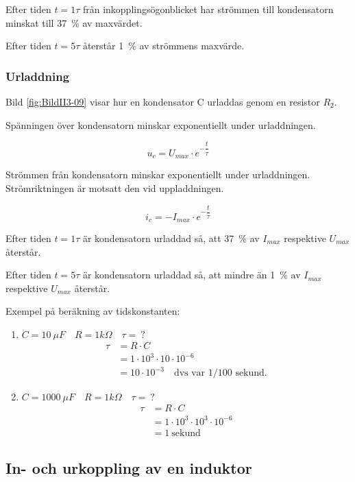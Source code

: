 Efter tiden \(t = 1\tau\) från inkopplingsögonblicket har strömmen till
kondensatorn minskat till 37~\% av maxvärdet.

Efter tiden \(t = 5\tau\) återstår 1~\% av strömmens maxvärde.

\subsubsection{Urladdning}


Bild \ref{fig:BildII3-09} visar hur en kondensator C urladdas genom en resistor \(R_2\).

Spänningen över kondensatorn minskar exponentiellt under urladdningen.

\[u_c = U_{max} \cdot e^{-\dfrac{t}{\tau}}\]

Strömmen från kondensatorn minskar exponentiellt under urladdningen.
Strömriktningen är motsatt den vid uppladdningen.

\[i_c = - I_{max} \cdot e^{-\dfrac{t}{\tau}}\]

Efter tiden \(t = 1\tau\) är kondensatorn urladdad så, att 37~\% av \(I_{max}\)
respektive \(U_{max}\) återstår.

Efter tiden \(t = 5\tau\) är kondensatorn urladdad så, att mindre än 1~\% av
\(I_{max}\) respektive \(U_{max}\) återstår.

Exempel på beräkning av tidskonstanten:
\begin{enumerate}
\item \(C = 10\ \mu F \quad R = 1 k\Omega \quad \tau =\ ?\)
  \begin{align*}
    \tau &= R \cdot C \\
    &= 1 \cdot 10^3 \cdot 10 \cdot 10^{-6} \\
    &= 10 \cdot 10^{-3} \quad \text{dvs var 1/100 sekund.}
  \end{align*}
\item \(C = 1000\ \mu F \quad R = 1 k\Omega \quad \tau =\ ?\)
  \begin{align*}
    \tau &= R \cdot C \\
    &= 1 \cdot 10^3 \cdot 10^3 \cdot 10^{-6} \\
    &= 1\ \text{sekund}
  \end{align*}
\end{enumerate}

\subsection{In- och urkoppling av en induktor}

